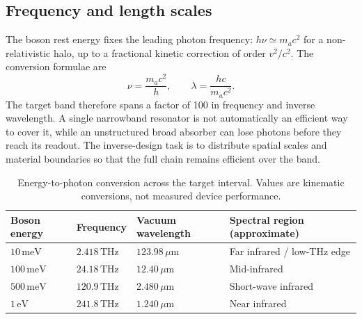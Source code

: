 \documentclass[10.5pt,a4paper]{article}
\newcommand{\um}{\,\mu\mathrm{m}}
\begin{document}
\subsection{Frequency and length scales}
The boson rest energy fixes the leading photon frequency: $h\nu\simeq m_a c^2$ for a non-relativistic halo, up to a fractional kinetic correction of order $v^2/c^2$. The conversion formulae are
\begin{equation}
\nu = \frac{m_a c^2}{h},\qquad
\lambda = \frac{hc}{m_a c^2}.
\label{eq:massfreq}
\end{equation}
The target band therefore spans a factor of 100 in frequency and inverse wavelength. A single narrowband resonator is not automatically an efficient way to cover it, while an unstructured broad absorber can lose photons before they reach its readout. The inverse-design task is to distribute spatial scales and material boundaries so that the full chain remains efficient over the band.

\begin{table}[H]
\centering\small
\caption{Energy-to-photon conversion across the target interval. Values are kinematic conversions, not measured device performance.}
\begin{tabularx}{\textwidth}{p{}p{}p{}Y}
\toprule
Boson energy & Frequency & Vacuum wavelength & Spectral region (approximate)\\
\midrule
$10\,\mathrm{meV}$ & $2.418\,\mathrm{THz}$ & $123.98\um$ & Far infrared / low-THz edge\\
$100\,\mathrm{meV}$ & $24.18\,\mathrm{THz}$ & $12.40\um$ & Mid-infrared\\
$500\,\mathrm{meV}$ & $120.9\,\mathrm{THz}$ & $2.480\um$ & Short-wave infrared\\
$1\,\mathrm{eV}$ & $241.8\,\mathrm{THz}$ & $1.240\um$ & Near infrared\\
\bottomrule
\end{tabularx}
\end{table}
\end{document}

